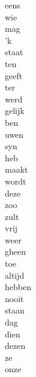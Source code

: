 \begin{minipage}[t]{0.25\textwidth}
	eens\\
	wie\\
	mag\\
	'k\\
	staat\\
	ten\\
	geeft\\
	ter\\
	werd\\
	gelijk\\
	ben\\
	uwen\\
	syn\\
	heb\\
	maakt\\
	wordt\\
	deze\\
	zoo\\
	zult\\
	vrij\\
	weer\\
	gheen\\
	toe\\
	altijd\\
	hebben\\
	nooit\\
	staan\\
	dag\\
	dien\\
	dezen\\
	ze\\
	onze\\ 
\end{minipage}